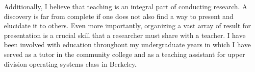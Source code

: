 \documentclass[11pt]{article}
\begin{document}

Additionally, I believe that teaching is an integral part of conducting research. A discovery is far from complete if one does not also find a way to present and elucidate it to others. Even more importantly, organizing a vast array of result for presentation is a crucial skill that a researcher must share with a teacher. I have been involved with education throughout my undergraduate years in which I have served as a tutor in the community college and as a teaching assistant for upper division operating systems class in Berkeley. \newline

%
\end{document}
